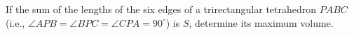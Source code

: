 If the sum of the lengths of the six edges of a trirectangular tetrahedron $ PABC$ (i.e., $ \angle APB = \angle BPC = \angle CPA = 90^\circ$) is $ S$,  determine its maximum volume.